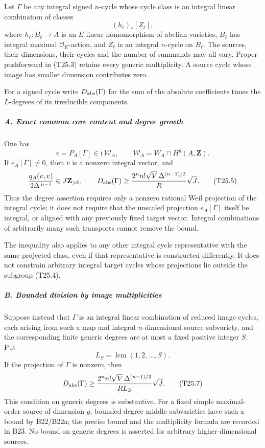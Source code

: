 Let \(\Gamma\) be any integral signed \(n\)-cycle whose cycle class is an integral linear combination of classes \[
 (h_\ell)_*[Z_\ell],
 \tag{T25.3}
\] where \(h_\ell:B_\ell\to A\) is an \(E\)-linear homomorphism of abelian varieties, \(B_\ell\) has integral maximal \(\mathcal O_E\)-action, and \(Z_\ell\) is an integral \(n\)-cycle on \(B_\ell\). The sources, their dimensions, their cycles and the number of summands may all vary. Proper pushforward in (T25.3) retains every generic multiplicity. A source cycle whose image has smaller dimension contributes zero.

For a signed cycle write \(D_{\rm abs}(\Gamma)\) for the sum of the absolute coefficients times the \(L\)-degrees of its irreducible components.

\subparagraph{A. Exact common core content and degree growth}\label{a.-exact-common-core-content-and-degree-growth}

One has \[
 v=P_A[\Gamma]\in\overline{\mathfrak j}\,\mathscr W_A,
 \qquad \mathscr W_A=W_A\cap H^g(A,\mathbf Z).
 \tag{T25.4}
\] If \(e_A[\Gamma]\ne0\), then \(v\) is a nonzero integral vector, and \[
 \frac{q_A(v,v)}{2\Delta^{\,n-1}}\in J\mathbf Z_{>0},
 \qquad
 D_{\rm abs}(\Gamma)
   \ge
    \frac{2^n n!\sqrt V\,\Delta^{(n-1)/2}}{R}\sqrt J.
 \tag{T25.5}
\] Thus the degree assertion requires only a nonzero rational Weil projection of the integral cycle; it does not require that the unscaled projection \(e_A[\Gamma]\) itself be integral, or aligned with any previously fixed target vector. Integral combinations of arbitrarily many such transports cannot remove the bound.

The inequality also applies to any other integral cycle representative with the same projected class, even if that representative is constructed differently. It does not constrain arbitrary integral target cycles whose projections lie outside the subgroup (T25.4).

\subparagraph{B. Bounded division by image multiplicities}\label{b.-bounded-division-by-image-multiplicities}

Suppose instead that \(\Gamma\) is an integral linear combination of reduced image cycles, each arising from such a map and integral \(n\)-dimensional source subvariety, and the corresponding finite generic degrees are at most a fixed positive integer \(S\). Put \[
 L_S=\operatorname{lcm}(1,2,\ldots,S).
 \tag{T25.6}
\] If the projection of \(\Gamma\) is nonzero, then \[
 D_{\rm abs}(\Gamma)
   \ge
    \frac{2^n n!\sqrt V\,\Delta^{(n-1)/2}}{R L_S}\sqrt J.
 \tag{T25.7}
\] This condition on generic degrees is substantive. For a fixed simple maximal-order source of dimension \(g\), bounded-degree middle subvarieties have such a bound by B22/B22a; the precise bound and the multiplicity formula are recorded in B23. No bound on generic degrees is asserted for arbitrary higher-dimensional sources.


